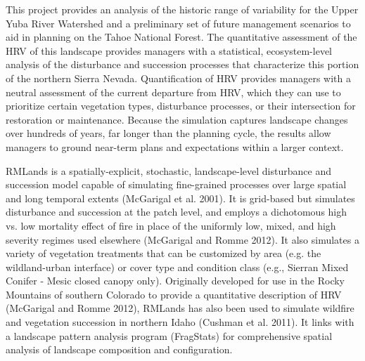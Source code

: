 This project provides an analysis of the historic range of variability for the Upper Yuba River Watershed and a preliminary set of future management scenarios to aid in planning on the Tahoe National Forest. The quantitative assessment of the HRV of this landscape provides managers with a statistical, ecosystem-level analysis of the disturbance and succession processes that characterize this portion of the northern Sierra Nevada. Quantification of HRV provides managers with a neutral assessment of the current departure from HRV, which they can use to prioritize certain vegetation types, disturbance processes, or their intersection for restoration or maintenance. Because the simulation captures landscape changes over hundreds of years, far longer than the planning cycle, the results allow managers to ground near-term plans and expectations within a larger context. 

RMLands is a spatially-explicit, stochastic, landscape-level disturbance and succession model capable of simulating fine-grained processes over large spatial and long temporal extents (McGarigal et al. 2001). It is grid-based but simulates disturbance and succession at the patch level, and employs a dichotomous high vs. low mortality effect of fire in place of the uniformly low, mixed, and high severity regimes used elsewhere (McGarigal and Romme 2012). It also simulates a variety of vegetation treatments that can be customized by area (e.g. the wildland-urban interface) or cover type and condition class (e.g., Sierran Mixed Conifer - Mesic closed canopy only). Originally developed for use in the Rocky Mountains of southern Colorado to provide a quantitative description of HRV (McGarigal and Romme 2012), RMLands has also been used to simulate wildfire and vegetation succession in northern Idaho (Cushman et al. 2011). It links with a landscape pattern analysis program (FragStats) for comprehensive spatial analysis of landscape composition and configuration.  

